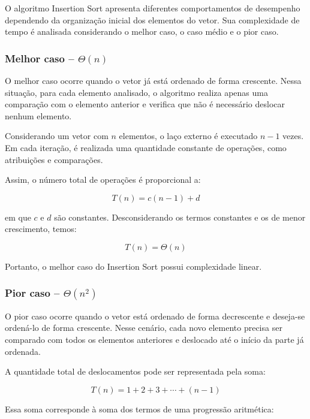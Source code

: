 O algoritmo Insertion Sort apresenta diferentes comportamentos de
desempenho dependendo da organização inicial dos elementos do vetor.
Sua complexidade de tempo é analisada considerando o melhor caso, o caso
médio e o pior caso.

\subsubsection{Melhor caso -- \texorpdfstring{$\Theta(n)$}{Theta(n)}}

O melhor caso ocorre quando o vetor já está ordenado de forma crescente.
Nessa situação, para cada elemento analisado, o algoritmo realiza apenas
uma comparação com o elemento anterior e verifica que não é necessário
deslocar nenhum elemento.

Considerando um vetor com $n$ elementos, o laço externo é executado
$n-1$ vezes. Em cada iteração, é realizada uma quantidade constante de
operações, como atribuições e comparações.

Assim, o número total de operações é proporcional a:

\begin{equation}
T(n) = c(n-1) + d
\end{equation}

em que $c$ e $d$ são constantes. Desconsiderando os termos constantes e
os de menor crescimento, temos:

\begin{equation}
T(n) = \Theta(n)
\end{equation}

Portanto, o melhor caso do Insertion Sort possui complexidade linear.

\subsubsection{Pior caso -- \texorpdfstring{$\Theta(n^2)$}{Theta(n²)}}

O pior caso ocorre quando o vetor está ordenado de forma decrescente e
deseja-se ordená-lo de forma crescente. Nesse cenário, cada novo elemento
precisa ser comparado com todos os elementos anteriores e deslocado até o
início da parte já ordenada.

A quantidade total de deslocamentos pode ser representada pela soma:

\begin{equation}
T(n) = 1 + 2 + 3 + \cdots + (n-1)
\end{equation}

Essa soma corresponde à soma dos termos de uma progressão aritmética:

